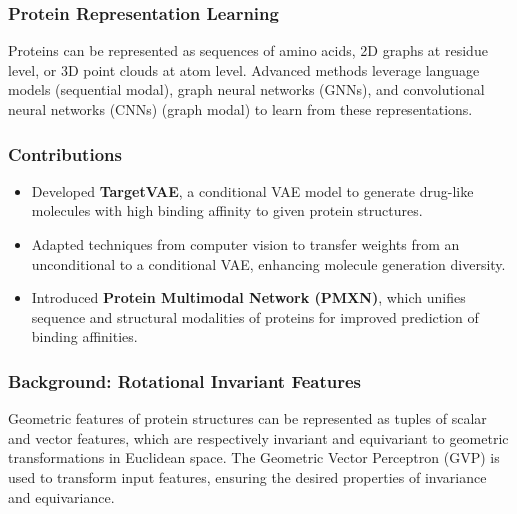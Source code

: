 \documentclass[11pt,xcolor={dvipsnames},hyperref={pdftex,pdfpagemode=UseNone,hidelinks,pdfdisplaydoctitle=true},usepdftitle=false]{beamer}
\begin{document}
\begin{frame}
    \frametitle{Protein Representation Learning}
    Proteins can be represented as sequences of amino acids, 2D graphs at residue level, or 3D point clouds at atom level. Advanced methods leverage language models (sequential modal), graph neural networks (GNNs), and convolutional neural networks (CNNs) (graph modal) to learn from these representations.
    
\end{frame}

\begin{frame}
    \frametitle{Contributions}
    \begin{itemize}
        \item Developed \textbf{TargetVAE}, a conditional VAE model to generate drug-like molecules with high binding affinity to given protein structures.
        \item Adapted techniques from computer vision to transfer weights from an unconditional to a conditional VAE, enhancing molecule generation diversity.
        \item Introduced \textbf{Protein Multimodal Network (PMXN)}, which unifies sequence and structural modalities of proteins for improved prediction of binding affinities.
    \end{itemize}
\end{frame}

\begin{frame}
    \frametitle{Background: Rotational Invariant Features}
    Geometric features of protein structures can be represented as tuples of scalar and vector features, which are respectively invariant and equivariant to geometric transformations in Euclidean space. The Geometric Vector Perceptron (GVP) is used to transform input features, ensuring the desired properties of invariance and equivariance.
    
\end{frame}
\end{document}

